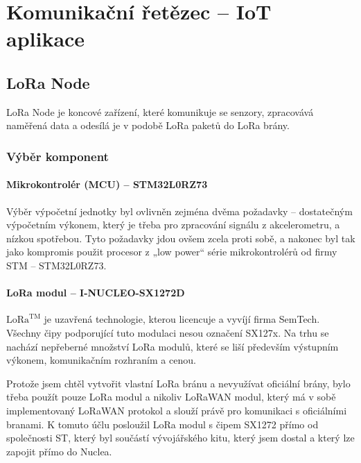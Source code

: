 
\chapter{Komunikační řetězec – IoT aplikace}


\section{LoRa Node}
    LoRa Node je koncové zařízení, které komunikuje se senzory, zpracovává naměřená data a odesílá je v podobě LoRa paketů do LoRa brány.

\subsection{Výběr komponent}

\subsubsection{Mikrokontrolér (MCU) – STM32L0RZ73 }

    Výběr výpočetní jednotky byl ovlivněn zejména dvěma požadavky – dostatečným výpočetním výkonem, který je třeba pro zpracování signálu z akcelerometru, a nízkou spotřebou. Tyto požadavky jdou ovšem zcela proti sobě, a nakonec byl tak jako kompromis použit procesor z „low power“ série mikrokontrolérů od firmy STM – STM32L0RZ73. 
    
    

\subsubsection{LoRa modul – I-NUCLEO-SX1272D}
    $\text{LoRa}^{\text{TM}}$ je uzavřená technologie, kterou licencuje a vyvíjí firma SemTech. Všechny čipy podporující tuto modulaci nesou označení SX127x. Na trhu se nachází nepřeberné množství LoRa modulů, které se liší především výstupním výkonem, komunikačním rozhraním a cenou.
    
    Protože jsem chtěl vytvořit vlastní LoRa bránu a nevyužívat oficiální brány, bylo třeba použít pouze LoRa modul a nikoliv LoRaWAN modul, který má v sobě implementovaný LoRaWAN protokol a slouží právě pro komunikaci s oficiálními branami. K tomuto účlu posloužil LoRa modul s čipem SX1272 přímo od společnosti ST, který byl součástí vývojářského kitu, který jsem dostal a který lze zapojit přímo do Nuclea.
    
